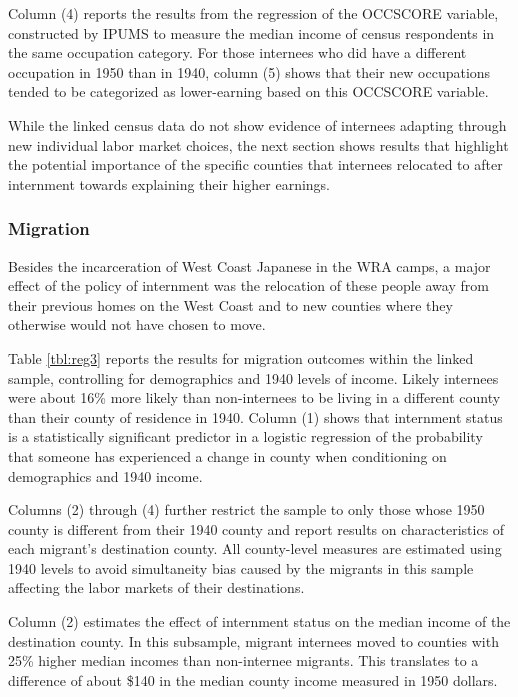 Column (4) reports the results from the regression of the OCCSCORE variable,
constructed by IPUMS to measure the median income of census respondents
in the same occupation category.
For those internees who did have a different occupation in 1950 than in 1940,
column (5) shows that their new occupations tended to be categorized
as lower-earning based on this OCCSCORE variable.

While the linked census data do not show evidence of internees
adapting through new individual labor market choices,
the next section shows results that highlight the potential importance of the
specific counties that internees relocated to after internment
towards explaining their higher earnings.

\subsubsection{Migration}

Besides the incarceration of West Coast Japanese in the WRA camps,
a major effect of the policy of internment was the relocation of these people
away from their previous homes on the West Coast and to new counties
where they otherwise would not have chosen to move.



Table \ref{tbl:reg3} reports the results for migration outcomes within the
linked sample,
controlling for demographics and 1940 levels of income.
Likely internees were about 16\% more likely than non-internees
to be living in a different county than their county of residence in 1940.
Column (1) shows that internment status is a statistically significant predictor 
in a logistic regression
of the probability that someone has experienced a change in county
when conditioning on demographics and 1940 income.

Columns (2) through (4) further restrict the sample to only those whose
1950 county is different from their 1940 county and report results on 
characteristics of each migrant's destination county.
All county-level measures are estimated using 1940 levels 
to avoid simultaneity bias caused by the migrants in this sample affecting
the labor markets of their destinations.

Column (2) estimates the effect of internment status on the 
median income of the destination county.
In this subsample, migrant internees moved to counties 
with 25\% higher median incomes than non-internee migrants.
This translates to a difference of about \$140 in the median county income
measured in 1950 dollars.

